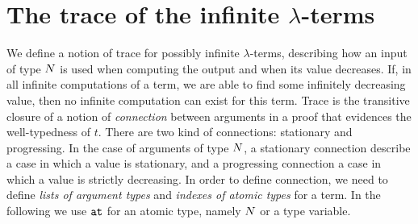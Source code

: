 \section{The trace of the infinite $\lambda$-terms}\label{section-trace-infinite-lambda-terms}


We define a notion of trace for possibly infinite $\lambda$-terms, 
describing how an input of type ${N}$ is used when computing the output
and when its value decreases. 
If, in all infinite computations of a term, we are able to find some infinitely
decreasing value, then no infinite computation can exist for this term. 
Trace is the transitive closure of a notion of \emph{connection} 
between arguments in a proof that evidences the well-typedness of $t$. 
There are two kind of connections: stationary and progressing.
In the case of arguments of type ${N}$, a stationary connection 
describe a case in which a value is stationary, and a progressing connection 
a case in which a value is strictly decreasing.
In order to define connection, we need to define \emph{lists of argument types} 
and \emph{indexes of atomic types} for a term.
In the following we use ${\tt at}$ for an atomic type, namely ${N}$ or a type variable. 

%
%

